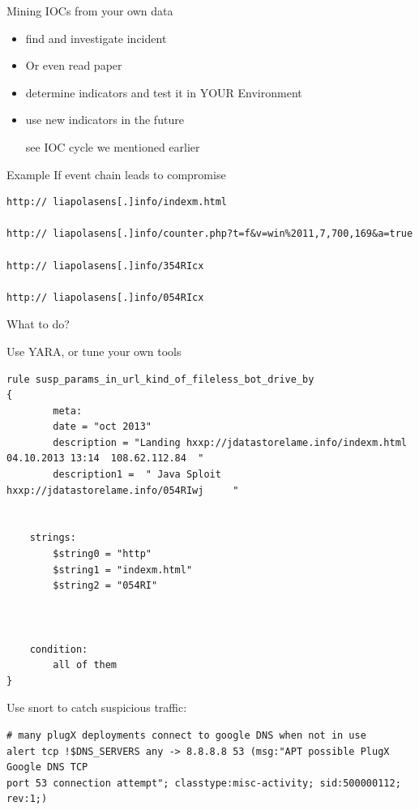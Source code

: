 \documentclass[presentation,smaller]{beamer}
\begin{document}
\begin{frame}[label=sec-7-5]{Mining IOCs from your own data}
\begin{itemize}
\item find and investigate incident
\item Or even read paper
\item determine indicators and test it in YOUR Environment
\item use new indicators in the future

\alert{see IOC cycle we mentioned earlier}
\end{itemize}
\end{frame}
\begin{frame}[fragile,label=sec-7-6]{Example}
 If event chain leads to compromise
\tiny
\lstset{language=sh,numbers=none}
\begin{lstlisting}
http:// liapolasens[.]info/indexm.html

http:// liapolasens[.]info/counter.php?t=f&v=win%2011,7,700,169&a=true

http:// liapolasens[.]info/354RIcx

http:// liapolasens[.]info/054RIcx
\end{lstlisting}
\normalsize
What to do?
\end{frame}
\begin{frame}[fragile,label=sec-7-7]{Use YARA, or tune your own tools}
 \tiny
\lstset{language=sh,numbers=none}
\begin{lstlisting}
rule susp_params_in_url_kind_of_fileless_bot_drive_by
{
        meta:
        date = "oct 2013"
        description = "Landing hxxp://jdatastorelame.info/indexm.html  04.10.2013 13:14  108.62.112.84  "  
        description1 =  " Java Sploit hxxp://jdatastorelame.info/054RIwj     "


    strings:
        $string0 = "http"
        $string1 = "indexm.html"
        $string2 = "054RI"



    condition:
        all of them
}
\end{lstlisting}
\normalsize
\end{frame}
\begin{frame}[fragile,label=sec-7-8]{Use snort to catch suspicious traffic:}
 \tiny
\lstset{language=sh,numbers=none}
\begin{lstlisting}
# many plugX deployments connect to google DNS when not in use
alert tcp !$DNS_SERVERS any -> 8.8.8.8 53 (msg:"APT possible PlugX Google DNS TCP
port 53 connection attempt"; classtype:misc-activity; sid:500000112;
rev:1;)
\end{lstlisting}
\normalsize
\end{frame}
\end{document}
